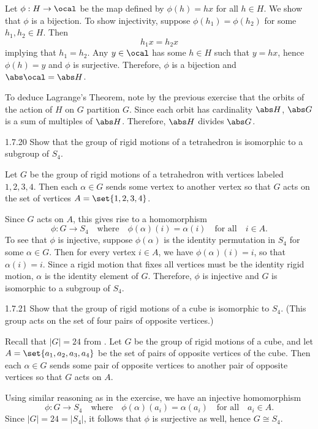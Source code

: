 \begin{sol}[spsol]
    Let $\phi : H \to \ocal$ be the map defined by $\phi(h) = hx$ for all $h \in H$.
	We show that $\phi$ is a bijection.
	To show injectivity, suppose $\phi(h_1) = \phi(h_2)$ for some $h_1, h_2 \in H$.
	Then
    \[
    	h_1 x = h_2 x
    \]
    implying that $h_1 = h_2$.
	Any $y \in \ocal$ has some $h \in H$ such that $y = hx$, hence $\phi(h) = y$ and $\phi$ is surjective.
	Therefore, $\phi$ is a bijection and $\abs \ocal = \abs H$.

    To deduce Lagrange's Theorem, note by the previous exercise that the orbits of the action of $H$ on $G$ partition $G$.
	Since each orbit has cardinality $\abs H$, $\abs G$ is a sum of multiples of $\abs H$.
	Therefore, $\abs H$ divides $\abs G$.
\end{sol}

\begin{exercise}{1.7.20}
    Show that the group of rigid motions of a tetrahedron is isomorphic to a subgroup of $S_4$.
\end{exercise}

\begin{sol}
    Let $G$ be the group of rigid motions of a tetrahedron with vertices labeled $1, 2, 3, 4$.
	Then each $\alpha \in G$ sends some vertex to another vertex so that $G$ acts on the set of vertices $A = \set{1, 2, 3, 4}$.

    Since $G$ acts on $A$, this gives rise to a homomorphism 
    \[
    	\phi : G \to S_4 \quad \text{where} \quad \phi(\alpha)(i) = \alpha(i) \quad \text{for all} \quad i \in A.
    \]
    To see that $\phi$ is injective, suppose $\phi(\alpha)$ is the identity permutation in $S_4$ for some $\alpha \in G$.
	Then for every vertex $i \in A$, we have $\phi(\alpha)(i) = i$, so that $\alpha(i) = i$.
	Since a rigid motion that fixes all vertices must be the identity rigid motion, $\alpha$ is the identity element of $G$.
	Therefore, $\phi$ is injective and $G$ is isomorphic to a subgroup of $S_4$.
\end{sol}

\begin{exercise}{1.7.21}
    Show that the group of rigid motions of a cube is isomorphic to $S_4$. (This group acts on the set of four pairs of opposite vertices.)
\end{exercise}

\begin{sol}
    Recall that $|G| = 24$ from .
	Let $G$ be the group of rigid motions of a cube, and let $A = \set{a_1, a_2, a_3, a_4}$ be the set of pairs of opposite vertices of the cube.
	Then each $\alpha \in G$ sends some pair of opposite vertices to another pair of opposite vertices so that $G$ acts on $A$.

    Using similar reasoning as in the exercise, we have an injective homomorphism
    \[
    	\phi : G \to S_4 \quad \text{where} \quad \phi(\alpha)(a_i) = \alpha(a_i) \quad \text{for all} \quad a_i \in A.
    \]
    Since $|G| = 24 = |S_4|$, it follows that $\phi$ is surjective as well, hence $G \cong S_4$.
\end{sol}

